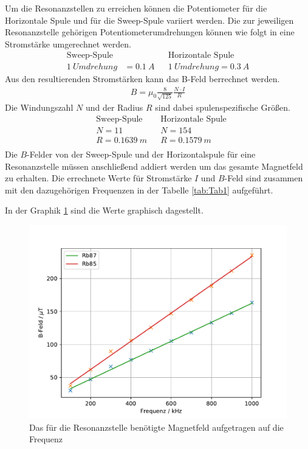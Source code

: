 Um die Resonanzstellen zu erreichen können die Potentiometer für die Horizontale Spule und für die Sweep-Spule variiert werden.
Die zur jeweiligen Resonanzstelle gehörigen Potentiometerumdrehungen können wie folgt in eine Stromstärke umgerechnet werden.
\begin{align*}
  \text{Sweep-Spule}&&&\text{Horizontale Spule}\\
  \SI{1}{Umdrehung} &= \SI{0,1}{A}&&\SI{1}{Umdrehung} = \SI{0,3}{A}
\end{align*}
Aus den resultierenden Stromstärken kann das B-Feld berrechnet werden.
\begin{align*}
  B=\mu_0\frac{8}{\sqrt{125}}\frac{N\cdot I}{R}
\end{align*}
Die Windungszahl $N$ und der Radius $R$ sind dabei spulenspezifische Größen.
\begin{align*}
  &\text{Sweep-Spule}&&\text{Horizontale Spule}\\
  &N=11&&N=154\\
  &R=\SI{0.1639}{m}&&R=\SI{0.1579}{m}\\
\end{align*}
Die $B$-Felder von der Sweep-Spule und der Horizontalspule für eine Resonanzstelle müssen anschließend addiert werden um das gesamte Magnetfeld zu erhalten.
Die errechnete Werte für Stromstärke $I$ und $B$-Feld sind zusammen mit den dazugehörigen Frequenzen in der Tabelle \ref{tab:Tab1} aufgeführt.

In der Graphik \ref{fig:Bf} sind die Werte graphisch dagestellt.
\begin{figure}[h!]
  \centering
  \includegraphics[width=\textwidth]{B-Feld.pdf}
  \caption{Das für die Resonanzstelle benötigte Magnetfeld aufgetragen auf die Frequenz}
  \label{fig:Bf}
\end{figure}
